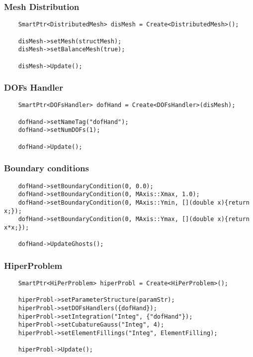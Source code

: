\documentclass[]{article}
\begin{document}
\subsubsection{Mesh Distribution} \label{sec: mshD}
\begin{lstlisting}
	SmartPtr<DistributedMesh> disMesh = Create<DistributedMesh>();
	
	disMesh->setMesh(structMesh);
	disMesh->setBalanceMesh(true);
	
	disMesh->Update();
\end{lstlisting}

\subsubsection{DOFs Handler} \label{sec: dofC}
\begin{lstlisting}
	SmartPtr<DOFsHandler> dofHand = Create<DOFsHandler>(disMesh);
	
	dofHand->setNameTag("dofHand");
	dofHand->setNumDOFs(1);
	
	dofHand->Update();
\end{lstlisting}

\subsubsection{Boundary conditions} \label{sec: BC}
\begin{lstlisting}
	dofHand->setBoundaryCondition(0, 0.0);
	dofHand->setBoundaryCondition(0, MAxis::Xmax, 1.0);
	dofHand->setBoundaryCondition(0, MAxis::Ymin, [](double x){return x;});
	dofHand->setBoundaryCondition(0, MAxis::Ymax, [](double x){return x*x;});
	
	dofHand->UpdateGhosts();
\end{lstlisting}

\subsubsection{HiperProblem} \label{sec: hpc}
\begin{lstlisting}
	SmartPtr<HiPerProblem> hiperProbl = Create<HiPerProblem>();
	
	hiperProbl->setParameterStructure(paramStr);
	hiperProbl->setDOFsHandlers({dofHand});
	hiperProbl->setIntegration("Integ", {"dofHand"});
	hiperProbl->setCubatureGauss("Integ", 4);
	hiperProbl->setElementFillings("Integ", ElementFilling);
	
	hiperProbl->Update();
\end{lstlisting}
\end{document}
